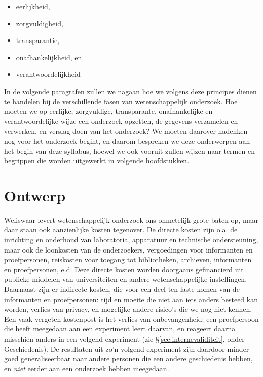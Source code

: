 \documentclass[
]{book}
\begin{document}
\begin{itemize}
\item
  eerlijkheid,
\item
  zorgvuldigheid,
\item
  transparantie,
\item
  onafhankelijkheid, en
\item
  verantwoordelijkheid
\end{itemize}

In de volgende paragrafen zullen we nagaan hoe we volgens deze principes
dienen te handelen bij de verschillende fasen van wetenschappelijk
onderzoek. Hoe moeten we op eerlijke, zorgvuldige, transparante,
onafhankelijke en verantwoordelijke wijze een onderzoek opzetten, de
gegevens verzamelen en verwerken, en verslag doen van het onderzoek? We
moeten daarover nadenken nog voor het onderzoek begint, en daarom
bespreken we deze onderwerpen aan het begin van deze syllabus, hoewel we
ook vooruit zullen wijzen naar termen en begrippen die worden uitgewerkt
in volgende hoofdstukken.

\hypertarget{sec:ontwerp}{%
\section{Ontwerp}\label{sec:ontwerp}}

Weliswaar levert wetenschappelijk onderzoek ons onmetelijk grote baten
op, maar daar staan ook aanzienlijke kosten tegenover. De directe kosten
zijn o.a. de inrichting en onderhoud van laboratoria, apparatuur en
technische ondersteuning, maar ook de loonkosten van de onderzoekers,
vergoedingen voor informanten en proefpersonen, reiskosten voor toegang
tot bibliotheken, archieven, informanten en proefpersonen, e.d. Deze
directe kosten worden doorgaans gefinancierd uit publieke middelen van
universiteiten en andere wetenschappelijke instellingen. Daarnaast zijn
er indirecte kosten, die voor een deel ten laste komen van de
informanten en proefpersonen: tijd en moeite die niet aan iets anders
besteed kan worden, verlies van privacy, en mogelijke andere risico's
die we nog niet kennen. Een vaak vergeten kostenpost is het verlies van
onbevangenheid: een proefpersoon die heeft meegedaan aan een experiment
leert daarvan, en reageert daarna misschien anders in een volgend
experiment (zie
§\ref{sec:internevaliditeit}, onder Geschiedenis). De resultaten
uit zo'n volgend experiment zijn daardoor minder goed generaliseerbaar
naar andere personen die een andere geschiedenis hebben, en \emph{niet}
eerder aan een onderzoek hebben meegedaan.
\end{document}
